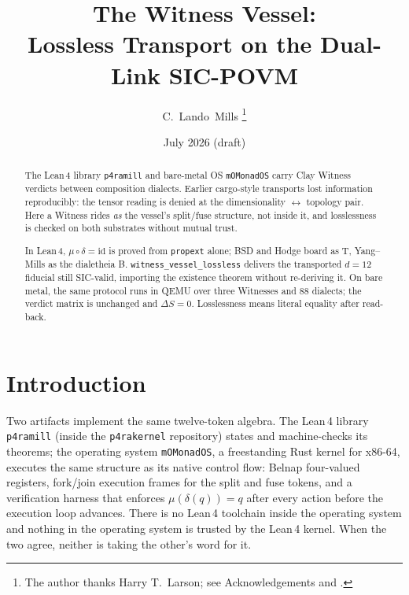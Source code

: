 \documentclass[12pt,a4paper]{article}
\newcommand{\Lean}{\textsf{Lean}\,4}
\newcommand{\bT}{\textsf{T}}
\newcommand{\bB}{\textsf{B}}
\begin{document}
\title{\textbf{The Witness Vessel:\\
Lossless Transport on the Dual-Link SIC-POVM}}

\author{C.\ Lando\ Mills%
\thanks{The author thanks Harry T.\ Larson; see Acknowledgements and \cite{Larson1961}.}}

\date{July 2026 (draft)}

\maketitle

\begin{abstract}
The \Lean{} library \texttt{p4ramill} and bare-metal OS \texttt{mOMonadOS}
carry Clay Witness verdicts between composition dialects. Earlier cargo-style
transports lost information reproducibly: the tensor reading is denied at the
dimensionality $\leftrightarrow$ topology pair. Here a Witness rides
\emph{as} the vessel's split/fuse structure, not inside it, and losslessness
is checked on both substrates without mutual trust.

In \Lean{}, $\mu\circ\delta=\mathrm{id}$ is proved from \texttt{propext}
alone; BSD and Hodge board as \bT{}, Yang--Mills as the dialetheia \bB{}.
\texttt{witness\_vessel\_lossless} delivers the transported $d=12$ fiducial
still SIC-valid, importing the existence theorem without re-deriving it. On
bare metal, the same protocol runs in QEMU over three Witnesses and $88$
dialects; the verdict matrix is unchanged and $\Delta S=0$. Losslessness
means literal equality after read-back.
\end{abstract}

\newpage
\tableofcontents
\newpage

\section{Introduction}

Two artifacts implement the same twelve-token algebra. The \Lean{} library
\texttt{p4ramill} (inside the \texttt{p4rakernel} repository) states and
machine-checks its theorems; the operating system \texttt{mOMonadOS}, a
freestanding Rust kernel for x86-64, executes the same structure as its
native control flow: Belnap four-valued registers, fork/join execution
frames for the split and fuse tokens, and a verification harness that
enforces $\mu(\delta(q)) = q$ after every action before the execution loop
advances. There is no \Lean{} toolchain inside the operating system and
nothing in the operating system is trusted by the \Lean{} kernel. When the
two agree, neither is taking the other's word for it.
\end{document}
